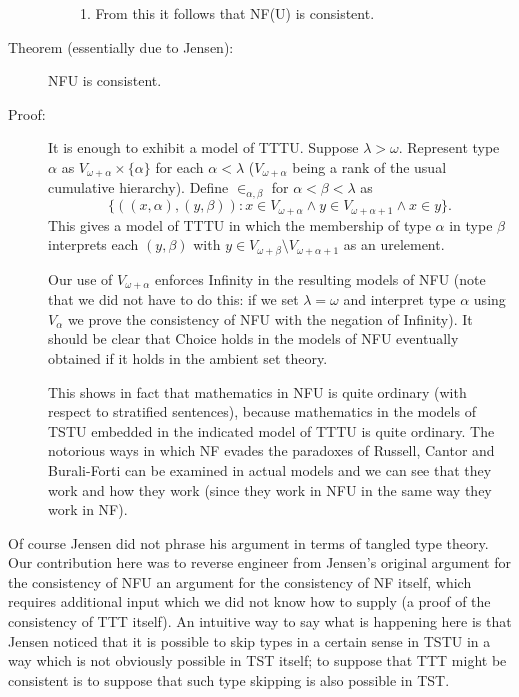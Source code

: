 \documentclass[112pt]{article}
\begin{document}
\begin{description}
\begin{enumerate}
\begin{enumerate}
\item From this it follows that NF(U) is consistent.

\end{enumerate}

\end{enumerate}

\item[Theorem (essentially due to Jensen):]  NFU is consistent.

\item[Proof:]  It is enough to exhibit a model of TTTU.  Suppose $\lambda>\omega$.  Represent type $\alpha$ as $V_{\omega+\alpha} \times \{\alpha\}$ for each $\alpha<\lambda$ ($V_{\omega+\alpha}$ being a rank of the usual cumulative hierarchy).  Define $\in_{\alpha,\beta}$ for
$\alpha<\beta<\lambda$ as $$\{((x,\alpha),(y,\beta)):x \in V_{\omega+\alpha} \wedge y \in V_{\omega+\alpha+1} \wedge x \in y\}.$$  This gives a model of TTTU in which the membership of
type $\alpha$ in type $\beta$ interprets each $(y,\beta)$ with $y \in V_{\omega+\beta} \setminus V_{\omega+\alpha+1}$ as an urelement.

Our use of $V_{\omega+\alpha}$ enforces Infinity in the resulting models of NFU (note that we did not have to do this:  if we set $\lambda=\omega$ and interpret type $\alpha$ using $V_\alpha$ we prove the consistency of NFU with the negation of Infinity).  It should be clear that Choice holds in the models of NFU eventually obtained if it holds in the ambient set theory.

This shows in fact that mathematics in NFU is quite ordinary (with respect to stratified sentences), because mathematics in the models of TSTU embedded in the indicated model of TTTU is quite ordinary.  The notorious ways in which NF evades the paradoxes of Russell, Cantor and Burali-Forti can be examined in actual models and we can see that they work and how they work (since they work in NFU in the same way they work in NF).

\end{description}

Of course Jensen did not phrase his argument in terms of tangled type theory.  Our contribution here was to reverse engineer from Jensen's original argument for the consistency of NFU an argument for the consistency of NF itself, which requires additional input which we did not know how to supply (a proof of the consistency of TTT itself).  An intuitive way to say what is happening here is that Jensen noticed that it is possible to skip types in a certain sense in TSTU in a way which is not obviously possible in TST itself;  to suppose that TTT might be consistent is to suppose that such type skipping is also possible in TST.
\end{document}
